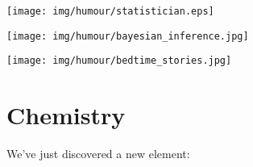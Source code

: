 	\begin{center}\underline{\hspace{5 cm}}\end{center}
	\begin{center}
	\texttt{[image: img/humour/statistician.eps]}
	\end{center}
		
	\begin{center}
	\texttt{[image: img/humour/bayesian\_inference.jpg]}
	\end{center}
	
	\begin{center}\underline{\hspace{5 cm}}\end{center}
	\begin{center}
	\texttt{[image: img/humour/bedtime\_stories.jpg]}
	\end{center}
		
	\pagebreak
	\section{Chemistry}

We've just discovered a new element:

